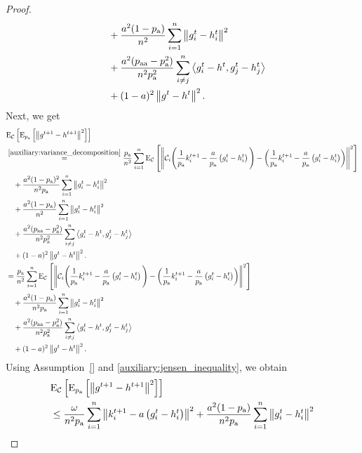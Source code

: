 \documentclass{article}
\begin{document}
\begin{proof}
\begin{align*}
    &\quad+ \frac{a^2 (1 - p_{\textnormal{a}})}{n^2}\sum_{i=1}^n\left\| g^{t}_i - h^{t}_i \right\|^2 \\
    &\quad +\frac{a^2 (p_{\textnormal{aa}} - p_{\textnormal{a}}^2)}{n^2 p_{\textnormal{a}}^2}\sum_{i \neq j}^n\left\langle g^{t}_i - h^{t},g^{t}_j - h^{t}_j\right\rangle \\
    &\quad + (1 - a)^2\left\| g^{t} - h^{t} \right\|^2.\\
  \end{align*}
  Next, we get
  \begin{align*}
    &{\rm E}_{\mathcal{C}}\left[{\rm E}_{p_{\textnormal{a}}}\left[\left\| g^{t+1} - h^{t+1} \right\|^2\right]\right] \\
    &\overset{\eqref{auxiliary:variance_decomposition}}{=}\frac{p_{\textnormal{a}}}{n^2}\sum_{i=1}^n{\rm E}_{\mathcal{C}}\left[\left\| \mathcal{C}_i\Bigg(\frac{1}{p_{\textnormal{a}}}k^{t+1}_i - \frac{a}{p_{\textnormal{a}}} \left(g^{t}_i - h^{t}_i\right)\Bigg) - \left(\frac{1}{p_{\textnormal{a}}}k^{t+1}_i - \frac{a}{p_{\textnormal{a}}} \left(g^{t}_i - h^{t}_i\right)\right) \right\|^2\right] \\
    &\quad +\frac{a^2 (1 - p_{\textnormal{a}})^2}{n^2 p_{\textnormal{a}}}\sum_{i=1}^n\left\| g^{t}_i - h^{t}_i \right\|^2 \\
    &\quad+ \frac{a^2 (1 - p_{\textnormal{a}})}{n^2}\sum_{i=1}^n\left\| g^{t}_i - h^{t}_i \right\|^2 \\
    &\quad +\frac{a^2 (p_{\textnormal{aa}} - p_{\textnormal{a}}^2)}{n^2 p_{\textnormal{a}}^2}\sum_{i \neq j}^n\left\langle g^{t}_i - h^{t},g^{t}_j - h^{t}_j\right\rangle \\
    &\quad + (1 - a)^2\left\| g^{t} - h^{t} \right\|^2.\\
    &=\frac{p_{\textnormal{a}}}{n^2}\sum_{i=1}^n{\rm E}_{\mathcal{C}}\left[\left\| \mathcal{C}_i\Bigg(\frac{1}{p_{\textnormal{a}}}k^{t+1}_i - \frac{a}{p_{\textnormal{a}}} \left(g^{t}_i - h^{t}_i\right)\Bigg) - \left(\frac{1}{p_{\textnormal{a}}}k^{t+1}_i - \frac{a}{p_{\textnormal{a}}} \left(g^{t}_i - h^{t}_i\right)\right) \right\|^2\right] \\
    &\quad +\frac{a^2 (1 - p_{\textnormal{a}})}{n^2 p_{\textnormal{a}}}\sum_{i=1}^n\left\| g^{t}_i - h^{t}_i \right\|^2 \\
    &\quad +\frac{a^2 (p_{\textnormal{aa}} - p_{\textnormal{a}}^2)}{n^2 p_{\textnormal{a}}^2}\sum_{i \neq j}^n\left\langle g^{t}_i - h^{t},g^{t}_j - h^{t}_j\right\rangle \\
    &\quad + (1 - a)^2\left\| g^{t} - h^{t} \right\|^2.\\
  \end{align*}
  Using Assumption~\ref{} and \eqref{auxiliary:jensen_inequality}, we obtain
  \begin{align*}
    &\ExpSub{\cC}{\ExpSub{\probavailable}{\norm{g^{t+1} - h^{t+1}}^2}} \\
    &\leq\frac{\omega}{n^2 \probavailable}\sum_{i=1}^n\norm{k^{t+1}_i - a \left(g^{t}_i - h^{t}_i\right)}^2 +\frac{a^2 (1 - \probavailable)}{n^2 \probavailable}\sum_{i=1}^n\norm{g^{t}_i - h^{t}_i}^2 \\

\end{align*}
\end{proof}
\end{document}
